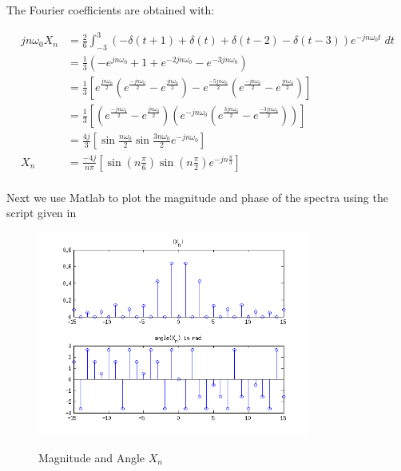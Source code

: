 The Fourier coefficients are obtained with:

\begin{equation*}
\begin{aligned}
j n \omega_0 X_n &= \frac{2}{6} \int_{-3}^3 (- \delta(t+1) + \delta(t) + \delta(t-2) - \delta(t-3) )e^{-j n \omega_0 t} \; dt\\
&= \frac{1}{3} (-e^{j n \omega_0} + 1 + e^{- 2 j n \omega_0} - e^{- 3 j n \omega_0}) \\
&= \frac{1}{3} [ 
	e^\frac{j n \omega_0}{2} ( e^\frac{- j n \omega_0}{2} - e^\frac{j n \omega_0}{2}) -
	e^\frac{-5 j n \omega_0}{2} ( e^\frac{- j n \omega_0}{2} - e^\frac{j n \omega_0}{2})] \\
&= \frac{1}{3} [ 
	( e^\frac{- j n \omega_0}{2} - e^\frac{j n \omega_0}{2}) 
	( e^{- j n \omega_0} (e^\frac{3 j n \omega_0}{2} - e^\frac{-3 j n \omega_0}{2}))] \\
&= \frac{4 j }{3} [ \sin \frac{n \omega_0}{2} \sin \frac{3 n \omega_0}{2} e^{- j n \omega_0 }] \\
X_n &= \frac{-4 j}{n \pi} [ \sin (n \frac{\pi}{6}) \sin (n \frac{\pi}{2}) e^{- j n \frac{\pi}{3}}] \\
\end{aligned}
\end{equation*} 

Next we use Matlab to plot the magnitude and phase of the spectra using the script given in \cite{wprobl_c1}


\begin{figure}[H]
\caption{Magnitude and Angle $X_n$}
\centering
\includegraphics[width=0.8\textwidth]{figs/c1p1b.png}
\label{fig:c1p1b}
\end{figure} 

